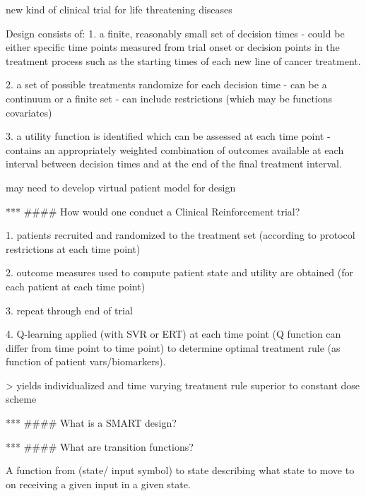 \documentclass[10pt]{article}
\begin{document}
new kind of clinical trial for life threatening diseases

Design consists of:
1. a finite, reasonably small set of decision times
	- could be either specific time points measured from trial onset or decision points in the treatment process such as the starting times of each new line of cancer treatment. 

2. a set of possible treatments randomize for each decision time
	- can be a continuum or a finite set
	- can include restrictions (which may be functions covariates)

3. a utility function is identified which can be assessed at each time point
	- contains an appropriately weighted combination of outcomes available at each interval between decision times and at the end of the final treatment interval.
	
may need to develop virtual patient model for design 


***
#### How would one conduct a Clinical Reinforcement trial?

1. patients recruited and randomized to the treatment set (according to protocol restrictions at each time point)

2. outcome measures used to compute patient state and utility are obtained (for each patient at each time point)

3. repeat through end of trial

4. Q-learning applied (with SVR or ERT) at each time point (Q function can differ from time point to time point) to determine optimal treatment rule (as function of patient vars/biomarkers).

> yields individualized and time varying treatment rule superior to constant dose scheme


***
#### What is a SMART design?
	
***
#### What are transition functions?

A function from (state/ input symbol) to state describing what state to move to on receiving a given input in a given state.
\end{document}
